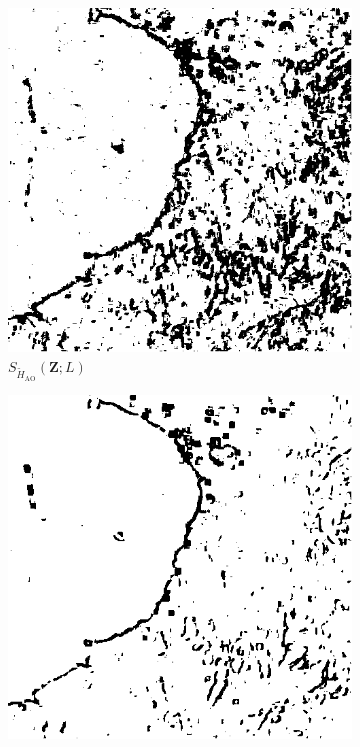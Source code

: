 \begin{figure}[H]
  \centering
  \begin{subfigure}[b]{0.3\textwidth}
    \centering
    \includegraphics[width=\textwidth]{../../Figures/PNG/H_005__Mexico_512_18L_AO_200b}
    \caption{$S_{\widetilde{H}_{\text{AO}}}(\bm{Z}; L)$}
    \label{fig:Mexico_crops_0.05-1}
  \end{subfigure}
  \hfill
  \begin{subfigure}[b]{0.3\textwidth}
    \centering
    \includegraphics[width=\textwidth]{../../Figures/PNG/cv_005_pvalues_mexico_512}

\end{subfigure}
\end{figure}
